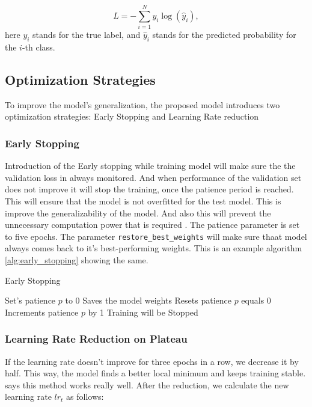 \documentclass[12pt,onecolumn]{report}
\begin{document}
\begin{equation}
    L = -\sum_{i=1}^{N} y_i \log(\hat{y}_i),
    \label{eq:categorical_crossentropy}
\end{equation}
here \(y_i\) stands for the true label, and \(\hat{y}_i\) stands for the predicted probability for the \(i\)-th class.

\subsection{Optimization Strategies}
To improve the model's generalization, the proposed model introduces two optimization strategies: Early Stopping and Learning Rate reduction

\subsubsection{Early Stopping}
Introduction of the Early stopping while training model will make sure the the validation loss in always monitored. And when performance of the validation set does not improve it will stop the training, once the patience period is reached. This will ensure that the model is not overfitted for the test model. This is improve the generalizability of the model. And also this will prevent the unnecessary computation power that is required \cite{1996Lutz}. The patience parameter is set to five epochs. The parameter \texttt{restore\_best\_weights} will make sure thaat model always comes back to it's best-performing weights. This is an example algorithm \ref{alg:early_stopping} showing the same.

\begin{algorithm}[h]
\caption{Early Stopping}
\label{alg:early_stopping}
\begin{algorithmic}[1]
\State Set's patience \( p \) to 0
        \State Saves the model weights
        \State Resets patience \( p \) equals 0
    \Else
        \State Increments patience \( p \) by 1
    \EndIf
        \State Training will be Stopped
    \EndIf
\EndFor
\end{algorithmic}
\end{algorithm}

\subsubsection{Learning Rate Reduction on Plateau}
If the learning rate doesn’t improve for three epochs in a row, we decrease it by half. This way, the model finds a better local minimum and keeps training stable. \cite{2017Loshchilov} says this method works really well. After the reduction, we calculate the new learning rate \(lr_t\) as follows:
\end{document}
